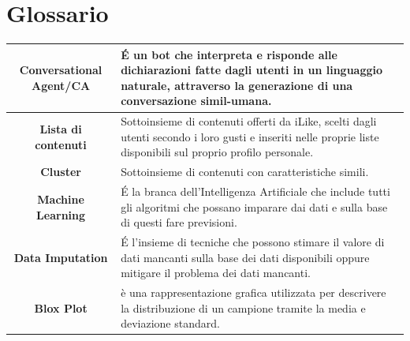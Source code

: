 \documentclass[a4paper, 10pt]{report}
\begin{document}
    \chapter{Glossario}\label{ch:glossario}
    \begin{adjustbox}{width=\columnwidth,center}
        \begin{tabular}{|c|p{8cm}|}
            \hline \textbf{Conversational Agent/CA} & É un bot che interpreta e risponde alle dichiarazioni fatte dagli utenti
            in un linguaggio naturale, attraverso la  generazione di una conversazione simil-umana.\\
            \hline \textbf{Lista di contenuti} & Sottoinsieme di contenuti offerti da iLike, scelti dagli utenti secondo i loro gusti
            e inseriti nelle proprie liste disponibili sul proprio profilo personale.\\
            \hline \textbf{Cluster} & Sottoinsieme di contenuti con caratteristiche simili.\\
            \hline \textbf{Machine Learning} & É la branca dell'Intelligenza Artificiale che include tutti gli algoritmi
            che possano imparare dai dati e sulla base di questi fare previsioni.\\
            \hline \textbf{Data Imputation} & É l'insieme di tecniche che possono stimare il valore di dati mancanti
            sulla base dei dati disponibili oppure mitigare il problema dei dati mancanti.\\
            \hline \textbf{Blox Plot} & è una rappresentazione grafica utilizzata per descrivere la distribuzione di un campione
            tramite la media e deviazione standard.\\
            \hline
        \end{tabular}
    \end{adjustbox}
\end{document}

